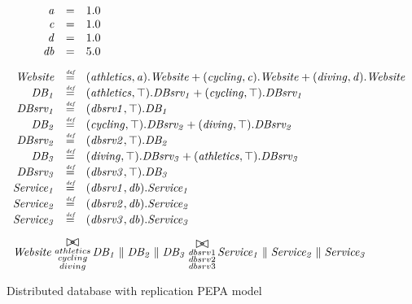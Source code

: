 \begin{figure}
	\caption{Distributed database with replication PEPA model}
	\label{figure:pepa_ddwr_model}
	\centering
	\begin{displaymath}
	\begin{array}{rcl}
	\mathit{a} & = & 1.0\\
	\mathit{c} & = & 1.0\\
	\mathit{d} & = & 1.0\\
	\mathit{db} & = & 5.0\\
	[2.0ex]		\mathit{Website} & \rmdef & (\mathit{athletics},\mathit{a}).\mathit{Website}+(\mathit{cycling},\mathit{c}).\mathit{Website}+(\mathit{diving},\mathit{d}).\mathit{Website}\\
	\mathit{DB_1} & \rmdef & (\mathit{athletics},\top).\mathit{DBsrv_1}+(\mathit{cycling},\top).\mathit{DBsrv_1}\\
	\mathit{DBsrv_1} & \rmdef & (\mathit{dbsrv1},\top).\mathit{DB_1}\\
	\mathit{DB_2} & \rmdef & (\mathit{cycling},\top).\mathit{DBsrv_2}+(\mathit{diving},\top).\mathit{DBsrv_2}\\
	\mathit{DBsrv_2} & \rmdef & (\mathit{dbsrv2},\top).\mathit{DB_2}\\
	\mathit{DB_3} & \rmdef & (\mathit{diving},\top).\mathit{DBsrv_3}+(\mathit{athletics},\top).\mathit{DBsrv_3}\\
	\mathit{DBsrv_3} & \rmdef & (\mathit{dbsrv3},\top).\mathit{DB_3}\\
	\mathit{Service_1} & \rmdef & (\mathit{dbsrv1},\mathit{db}).\mathit{Service_1}\\
	\mathit{Service_2} & \rmdef & (\mathit{dbsrv2},\mathit{db}).\mathit{Service_2}\\
	\mathit{Service_3} & \rmdef & (\mathit{dbsrv3},\mathit{db}).\mathit{Service_3}\\
	[2.0ex]		\multicolumn{3}{l}{\mathit{Website}\sync{\substack{athletics\\cycling\\diving}}\mathit{DB_1}\parallel\mathit{DB_2}\parallel\mathit{DB_3}\sync{\substack{dbsrv1\\dbsrv2\\dbsrv3}}\mathit{Service_1}\parallel\mathit{Service_2}\parallel\mathit{Service_3}}\\
	[2.0ex]	\end{array}
	\end{displaymath}
\end{figure}

